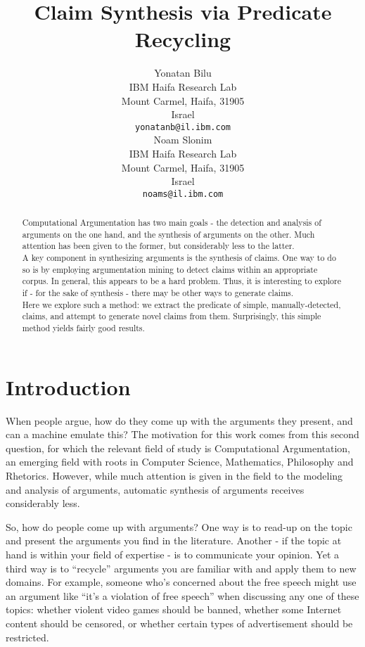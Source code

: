 \documentclass[11pt]{article}
\title{Claim Synthesis via Predicate Recycling}
\author{Yonatan Bilu \\
 IBM Haifa Research Lab\\ Mount Carmel, Haifa, 31905\\
 Israel\\
  {\tt yonatanb@il.ibm.com} \\\And
  Noam Slonim \\
IBM Haifa Research Lab\\ Mount Carmel, Haifa, 31905\\
 Israel\\
  {\tt noams@il.ibm.com} \\}
\date{}
\begin{document}
\maketitle
\begin{abstract}
Computational Argumentation has two main goals - the detection and analysis of arguments on the one hand, and the synthesis of arguments on the other. Much attention has been given to the former, but considerably less to the latter. \\
A key component in synthesizing arguments is the synthesis of claims. One way to do so is by employing argumentation mining to detect claims within an appropriate corpus. In general, this appears to be a hard problem. Thus, it is interesting to explore if - for the sake of synthesis - there may be other ways to generate claims.\\
Here we explore such a method: we extract the predicate of simple, manually-detected, claims, and attempt to generate novel claims from them. Surprisingly, this simple method yields fairly good results.
\end{abstract}


\section{Introduction}
When people argue, how do they come up with the arguments they present, and can a machine emulate this? The motivation for this work comes from this second question, for which the relevant field of study is Computational Argumentation, an emerging field with roots in Computer Science, Mathematics, Philosophy and Rhetorics. However, while much attention is given in the field to the modeling and analysis of arguments, automatic synthesis of arguments receives considerably less.

So, how do people come up with arguments? One way is to read-up on the topic and present the arguments you 
find in the literature. Another - if the topic at hand is within your field of expertise - is to communicate your opinion. 
Yet a third way  is to ``recycle'' arguments you are familiar with and apply them to new domains. 
For example, someone who's concerned about the free speech might use 
an argument like %
``it's a violation of free speech'' %
when discussing any one of these topics: whether violent video games should be banned, 
whether some Internet content should be censored, %
or whether certain types of advertisement should be restricted. 
\end{document}
